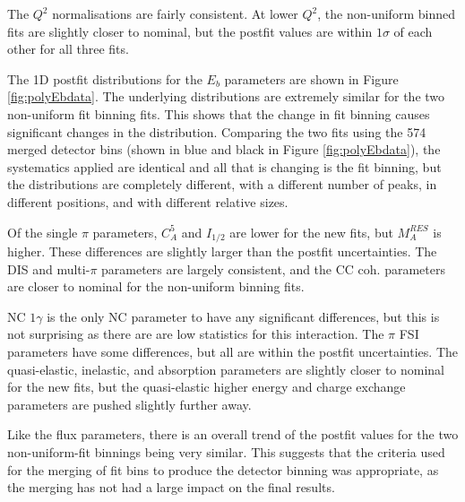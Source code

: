The $Q^2$ normalisations are fairly consistent. At lower $Q^2$, the non-uniform binned fits are slightly closer to nominal, but the postfit values are within $1\sigma$ of each other for all three fits. 

The 1D postfit distributions for the $E_b$ parameters are shown in Figure \ref{fig:polyEbdata}. The underlying distributions are extremely similar for the two non-uniform fit binning fits. This shows that the change in fit binning causes significant changes in the distribution. Comparing the two fits using the 574 merged detector bins (shown in blue and black in Figure \ref{fig:polyEbdata}), the systematics applied are identical and all that is changing is the fit binning, but the distributions are completely different, with a different number of peaks, in different positions, and with different relative sizes. 

Of the single $\pi$ parameters, $C_A^{5}$ and $I_{1/2}$ are lower for the new fits, but $M_A^{RES}$ is higher. These differences are slightly larger than the postfit uncertainties. The DIS and multi-$\pi$ parameters are largely consistent, and the CC coh. parameters are closer to nominal for the non-uniform binning fits.

NC $1\gamma$ is the only NC parameter to have any significant differences, but this is not surprising as there are are low statistics for this interaction. The $\pi$ FSI parameters have some differences, but all are within the postfit uncertainties. The quasi-elastic, inelastic, and absorption parameters are slightly closer to nominal for the new fits, but the quasi-elastic higher energy and charge exchange parameters are pushed slightly further away.

Like the flux parameters, there is an overall trend of the postfit values for the two non-uniform-fit binnings being very similar. This suggests that the criteria used for the merging of fit bins to produce the detector binning was appropriate, as the merging has not had a large impact on the final results. 

